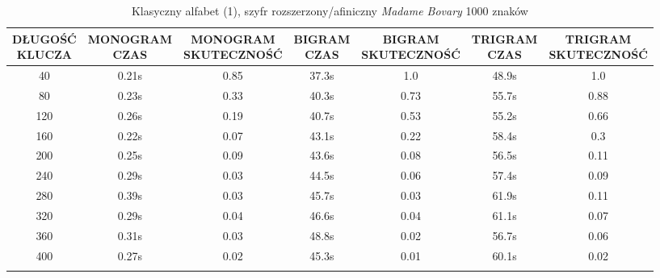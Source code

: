 \documentclass[a4paper]{article}
\theoremstyle{defn}
\theoremstyle{theorem}
\theoremstyle{lemma}
\theoremstyle{cor}
\theoremstyle{fact}
\begin{document}
\begin{center}\begin{small}\begin{longtable}{|c|c|c|c|c|c|c|} 
\hline \makecell{DŁUGOŚĆ\\KLUCZA} &  \makecell{MONOGRAM\\CZAS} & \makecell{MONOGRAM\\SKUTECZNOŚĆ} & \makecell{BIGRAM\\CZAS} &  \makecell{BIGRAM\\SKUTECZNOŚĆ} & \makecell{TRIGRAM\\CZAS} & \makecell{TRIGRAM\\SKUTECZNOŚĆ}\\ \hline 
40 & 0.21s & 0.85 & 37.3s & 1.0 & 48.9s & 1.0 \\ \hline 
80 & 0.23s & 0.33 & 40.3s & 0.73 & 55.7s & 0.88 \\ \hline 
120 & 0.26s & 0.19 & 40.7s & 0.53 & 55.2s & 0.66 \\ \hline 
160 & 0.22s & 0.07 & 43.1s & 0.22 & 58.4s & 0.3 \\ \hline 
200 & 0.25s & 0.09 & 43.6s & 0.08 & 56.5s & 0.11 \\ \hline 
240 & 0.29s & 0.03 & 44.5s & 0.06 & 57.4s & 0.09 \\ \hline 
280 & 0.39s & 0.03 & 45.7s & 0.03 & 61.9s & 0.11 \\ \hline 
320 & 0.29s & 0.04 & 46.6s & 0.04 & 61.1s & 0.07 \\ \hline 
360 & 0.31s & 0.03 & 48.8s & 0.02 & 56.7s & 0.06 \\ \hline 
400 & 0.27s & 0.02 & 45.3s & 0.01 & 60.1s & 0.02 \\ \hline 
\caption{Klasyczny alfabet (1), szyfr rozszerzony/afiniczny \textit{Madame Bovary} 1000 znaków}
\end{longtable}\end{small}\end{center} 
\end{document}
